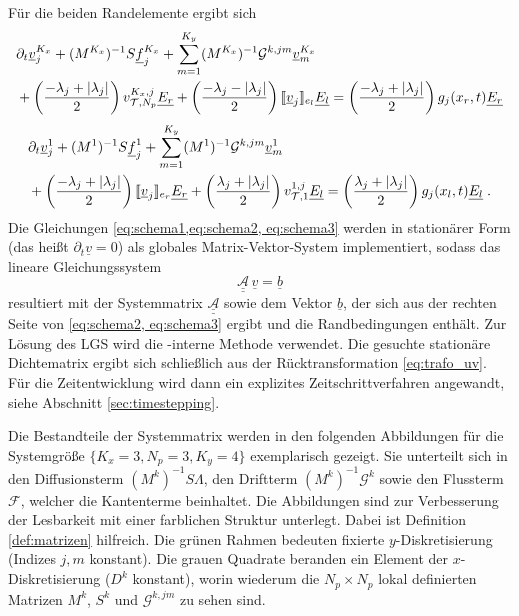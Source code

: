 Für die beiden Randelemente ergibt sich
\begin{equation}
  \begin{aligned}
      &\partial_t \underline{v}_j^{K_x} + (M^{K_x})^{-1}S \underline{f}_j^{K_x} + \sum_{m=1}^{K_y} (M^{K_x})^{-1}\mathcal{G}^{k,jm}\underline{v}_m^{K_x} \\
      &+ \left(\frac{-\lambda_j + |\lambda_j|}{2}\right) v_{\mathcal{T},N_p}^{K_x,j} \underline{E_r} +
         \left(\frac{-\lambda_j - |\lambda_j|}{2}\right) \llbracket \underline{v}_j \rrbracket_{e_l}\underline{E_l} =
         \left(\frac{-\lambda_j + |\lambda_j|}{2}\right) g_j(x_r,t)\underline{E_r}
  \end{aligned}
  \label{eq:schema2}
\end{equation}
\begin{equation}
  \begin{aligned}
      &\partial_t \underline{v}_j^{1} + (M^{1})^{-1}S \underline{f}_j^{1} + \sum_{m=1}^{K_y} (M^{1})^{-1}\mathcal{G}^{k,jm}\underline{v}_m^{1} \\
        &+ \left(\frac{-\lambda_j + |\lambda_j|}{2}\right) \llbracket \underline{v}_j \rrbracket_{e_r}\underline{E_r} +
           \left(\frac{\lambda_j + |\lambda_j|}{2}\right) v_{\mathcal{T},1}^{1,j} \underline{E_l}
        =\left(\frac{\lambda_j + |\lambda_j|}{2}\right) g_j(x_l,t)\underline{E_l} \; .
  \end{aligned}
  \label{eq:schema3}
\end{equation}
Die Gleichungen \eqref{eq:schema1,eq:schema2, eq:schema3} werden in stationärer Form (das heißt $\partial_t \underline{v}=0$) als globales Matrix-Vektor-System implementiert, sodass das lineare Gleichungssystem
\begin{equation}
  \underline{\underline{\mathcal{A}}}\,\underline{v} = \underline{b}
\end{equation}
resultiert mit der Systemmatrix $\underline{\underline{\mathcal{A}}}$ sowie dem Vektor $\underline{b}$, der sich aus der rechten Seite von \eqref{eq:schema2, eq:schema3} ergibt und die Randbedingungen enthält. Zur Lösung des LGS wird die \mat-interne Methode verwendet. Die gesuchte stationäre Dichtematrix ergibt sich schließlich aus der Rücktransformation \eqref{eq:trafo_uv}. Für die Zeitentwicklung wird dann ein explizites Zeitschrittverfahren angewandt, siehe Abschnitt \ref{sec:timestepping}.

Die Bestandteile der Systemmatrix werden in den folgenden Abbildungen für die Systemgröße $\{K_x=3, N_p=3, K_y=4\}$ exemplarisch gezeigt. Sie unterteilt sich in den Diffusionsterm $(M^k)^{-1}S\Lambda$, den Driftterm $(M^k)^{-1}\mathcal{G}^k$ sowie den Flussterm $\mathcal{F}$, welcher die Kantenterme beinhaltet. Die Abbildungen sind zur Verbesserung der Lesbarkeit mit einer farblichen Struktur unterlegt. Dabei ist Definition \ref{def:matrizen} hilfreich. Die grünen Rahmen bedeuten fixierte $y$-Diskretisierung (Indizes $j,m$ konstant). Die grauen Quadrate beranden ein Element der $x$-Diskretisierung ($D^k$ konstant), worin wiederum die $N_p \times N_p$ lokal definierten Matrizen $M^k$, $S^k$ und $\mathcal{G}^{k,jm}$ zu sehen sind.

